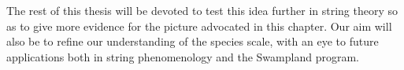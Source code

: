 The rest of this thesis will be devoted to test this idea further in string theory so as to give more evidence for the picture advocated in this chapter. Our aim will also be to refine our understanding of the species scale, with an eye to future applications both in string phenomenology and the Swampland program.